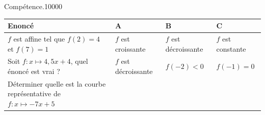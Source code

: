 \begin{pageAuto} %

\begin{ExoAutoN}{Compétence.}{1}{0}{0}{0}{0}
\vspace{.2cm}
\begin{tabular}{|M{.4\linewidth}|M{.17\linewidth}|M{.17\linewidth}|M{.17\linewidth}|}
\hline
Enoncé & A & B & C \\\hline
$f$ est affine tel que $f(2)=4$ et $f(7)=1$ & $f$ est croissante & $f$ est décroissante & $f$ est constante \\\hline
Soit $f:x\mapsto4,5x+4$, quel énoncé est vrai ? & $f$ est décroissante & $f(-2)<0$ & $f(-1)=0$ \\\hline
Déterminer quelle est la courbe représentative de $f:x\mapsto-7x+5$ &
\vspace{.1cm}


\end{tabular}
\end{ExoAutoN}
\end{pageAuto}

